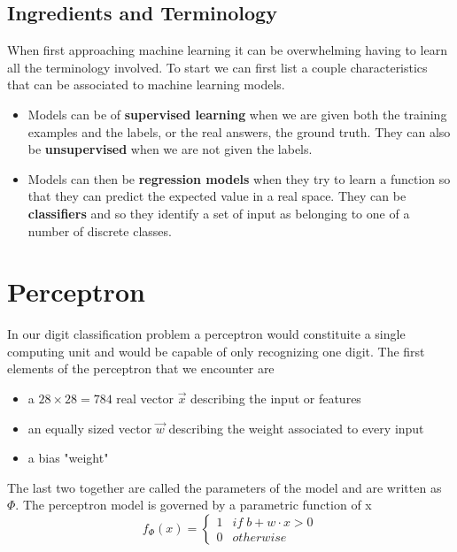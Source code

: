 \subsection*{Ingredients and Terminology}
When first approaching machine learning it can be overwhelming having to learn all the terminology involved. To start we can first list a couple characteristics that can be associated to machine learning models.
\begin{itemize}
    \item Models can be of \textbf{supervised learning} when we are given both the training examples and the labels, or the real answers, the ground truth. They can also be \textbf{unsupervised} when we are not given the labels.
    \item Models can then be \textbf{regression models} when they try to learn a function so that they can predict the expected value in a real space. They can be \textbf{classifiers} and so they identify a set of input as belonging to one of a number of discrete classes. 
\end{itemize}

\section{Perceptron}
In our digit classification problem a perceptron would constituite a single computing unit and would be capable of only recognizing one digit. The first elements of the perceptron that we encounter are
\begin{itemize}
    \item a $28 \times 28 = 784$ real vector $\vec{x}$ describing the input or features
    \item an equally sized vector $\vec{w}$ describing the weight associated to every input
    \item a bias "weight" 
\end{itemize}
The last two together are called the parameters of the model and are written as $\Phi$. The perceptron model is governed by a parametric function of x
\[ 
    f_\Phi(x) = \begin{cases}
        1 & if \; b+w\cdot x > 0\\
        0 & otherwise      
    \end{cases} 
\]
